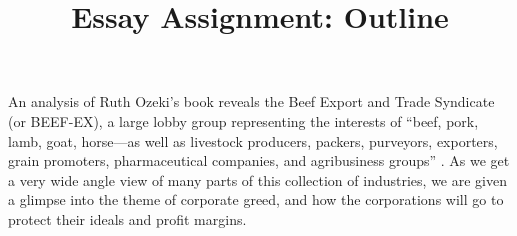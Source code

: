 \documentclass{article}
\title{Essay Assignment: Outline}
\begin{document}
\makeheader

An analysis of Ruth Ozeki's book  reveals the Beef
Export and Trade Syndicate (or BEEF-EX), a large lobby group representing
the interests of ``beef, pork, lamb, goat, horse—as well as livestock
producers, packers, purveyors, exporters, grain promoters, pharmaceutical
companies, and agribusiness groups'' \cite{ozeki1998my}. As we get a very
wide angle view of many parts of this collection of industries, we are given
a glimpse into the theme of corporate greed, and how the corporations will
go to protect their ideals and profit margins.

\end{document}
